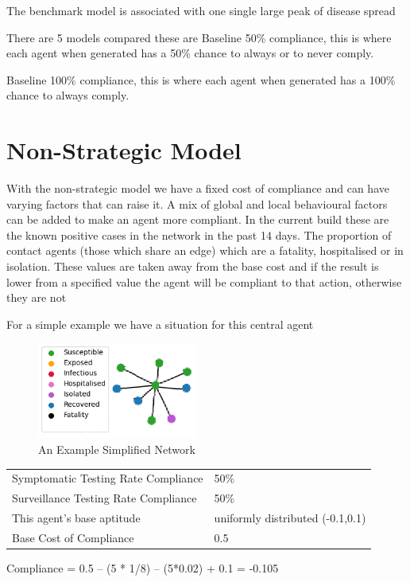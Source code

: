 \documentclass{article}
\begin{document}
The benchmark model is associated with one single large peak of disease spread

There are 5 models compared these are
Baseline 50\% compliance, this is where each agent when generated has a 50\% chance to always or to never comply. 

Baseline 100\% compliance, this is where each agent when generated has a 100\% chance to always comply. 

\newpage

\section{Non-Strategic Model}
With the non-strategic model we have a fixed cost of compliance and can have varying factors that can raise it. A mix of global and local behavioural factors can be added to make an agent more compliant. In the current build these are the known positive cases in the network in the past 14 days. The proportion of contact agents (those which share an edge) which are a fatality, hospitalised or in isolation. These values are taken away from the base cost and if the result is lower from a specified value the agent will be compliant to that action, otherwise they are not

For a simple example we have a situation for this central agent 

\begin{figure}[h!]
\centering
\includegraphics[width =150pt]{basicnet}
\caption{An Example Simplified Network}
\end{figure}


\begin{table}[h!]
\begin{tabular}{ll}
Symptomatic Testing Rate Compliance & 50\% \\
Surveillance Testing Rate Compliance & 50\% \\
This agent’s base aptitude & uniformly distributed (-0.1,0.1) \\
Base Cost of Compliance & 0.5 
\end{tabular}
\end{table}

Compliance = 0.5 – (5 * 1/8) – (5*0.02) + 0.1 = -0.105
\end{document}
